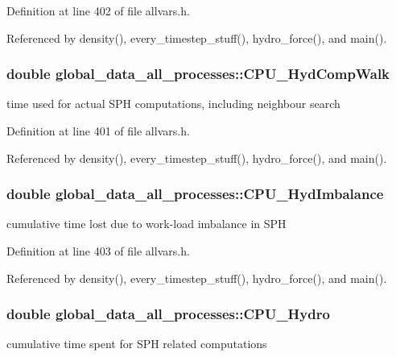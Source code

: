 Definition at line 402 of file allvars.h.



Referenced by density(), every\_\-timestep\_\-stuff(), hydro\_\-force(), and main().

\hypertarget{structglobal__data__all__processes_a918e3d80cf4fdaf22a803f4014588ad4}{
\subsubsection[{CPU\_\-HydCompWalk}]{\setlength{\rightskip}{0pt plus 5cm}double {\bf global\_\-data\_\-all\_\-processes::CPU\_\-HydCompWalk}}}
\label{structglobal__data__all__processes_a918e3d80cf4fdaf22a803f4014588ad4}
time used for actual SPH computations, including neighbour search 

Definition at line 401 of file allvars.h.



Referenced by density(), every\_\-timestep\_\-stuff(), hydro\_\-force(), and main().

\hypertarget{structglobal__data__all__processes_a848f914dfb3ae24d6faedc1944bcb265}{
\subsubsection[{CPU\_\-HydImbalance}]{\setlength{\rightskip}{0pt plus 5cm}double {\bf global\_\-data\_\-all\_\-processes::CPU\_\-HydImbalance}}}
\label{structglobal__data__all__processes_a848f914dfb3ae24d6faedc1944bcb265}
cumulative time lost due to work-\/load imbalance in SPH 

Definition at line 403 of file allvars.h.



Referenced by density(), every\_\-timestep\_\-stuff(), hydro\_\-force(), and main().

\hypertarget{structglobal__data__all__processes_add20a8e70f3c4cc7912dc81ef141daa2}{
\subsubsection[{CPU\_\-Hydro}]{\setlength{\rightskip}{0pt plus 5cm}double {\bf global\_\-data\_\-all\_\-processes::CPU\_\-Hydro}}}
\label{structglobal__data__all__processes_add20a8e70f3c4cc7912dc81ef141daa2}
cumulative time spent for SPH related computations 

